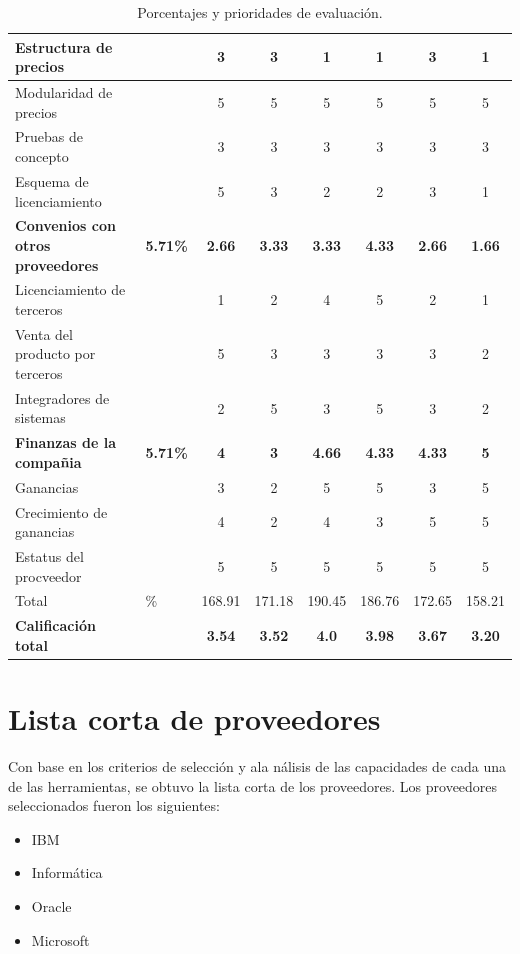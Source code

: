 \documentclass[a4paper,openright,12pt]{book}
\begin{document}
\begin{table}[htbp]
\begin{center}
{\begin{tabular}{|p{5.5cm}|>{\centering\arraybackslash}m{1.7cm}|c|c|c|c|c|c|}
\hline
Estructura de precios & & 3 & 3 & 1 & 1 & 3 & 1\\
\hline
Modularidad de precios & & 5 & 5 & 5 & 5 & 5 & 5\\
\hline
Pruebas de concepto & & 3 & 3 & 3 & 3 & 3 & 3\\
\hline
Esquema de licenciamiento & & 5 & 3 & 2 & 2 & 3 & 1\\
\hline
\rowcolor[gray]{0.9}\textbf{Convenios con otros proveedores} & \textbf{5.71\%} & \textbf{2.66} & \textbf{3.33} & \textbf{3.33} & \textbf{4.33} & \textbf{2.66} & \textbf{1.66}\\
\hline
Licenciamiento de terceros & & 1 & 2 & 4 & 5 & 2 & 1\\
\hline
Venta del producto por terceros & & 5 & 3 & 3 & 3 & 3 & 2\\
\hline
Integradores de sistemas & & 2 & 5 & 3 & 5 & 3 & 2\\
\hline
\rowcolor[gray]{0.9}\textbf{Finanzas de la compa\~nia} & \textbf{5.71\%} & \textbf{4} & \textbf{3} & \textbf{4.66} & \textbf{4.33} & \textbf{4.33} & \textbf{5}\\
\hline
Ganancias & & 3 & 2 & 5 & 5 & 3 & 5\\
\hline
Crecimiento de ganancias & & 4 & 2 & 4 & 3 & 5 & 5\\
\hline
Estatus del procveedor & & 5 & 5 & 5 & 5 & 5 & 5\\
\hline
Total & 100.00\% & 168.91 & 171.18 & 190.45 & 186.76 & 172.65 & 158.21\\
\hline
\rowcolor[gray]{0.9}\textbf{Calificaci\'on total} & & \textbf{3.54} & \textbf{3.52} & \textbf{4.0} & \textbf{3.98} & \textbf{3.67} & \textbf{3.20}\\
\hline
\end{tabular}}
\caption{Porcentajes y prioridades de evaluaci\'on.}
\label{tabla:criterios}
\end{center}
\end{table}

\section{Lista corta de proveedores}
Con base en los criterios de selecci\'on y ala n\'alisis de las capacidades de cada una de las herramientas, se obtuvo la lista corta de los proveedores. Los proveedores seleccionados fueron los siguientes:

\begin{itemize}
\item IBM
\item Inform\'atica
\item Oracle
\item Microsoft
\end{itemize}
\end{document}
